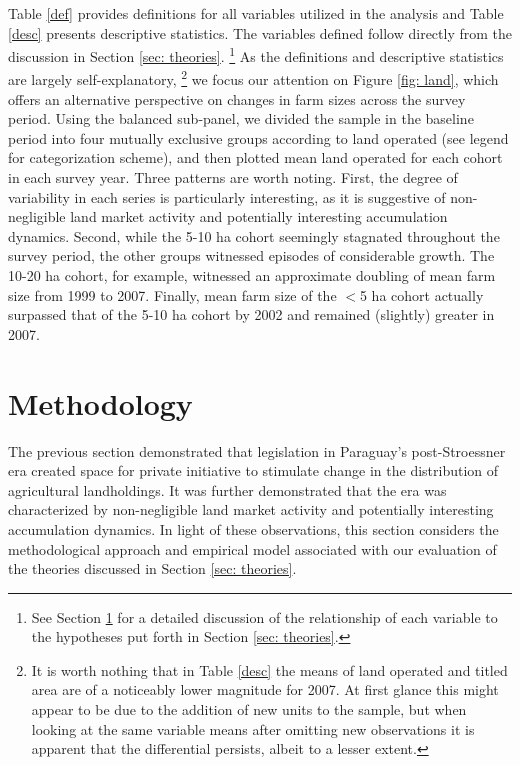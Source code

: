 \documentclass[english]{article}
\begin{document}
Table \ref{def} provides definitions for all variables utilized in the analysis 
and Table \ref{desc} presents descriptive statistics. 
The variables defined follow directly from the discussion in Section 
\ref{sec: theories}.%
\footnote{See Section \ref{sec: methodology} for a detailed 
discussion of the relationship of each variable to the hypotheses
put forth in Section \ref{sec: theories}.}
As the definitions and descriptive statistics are largely self-explanatory,%
\footnote{It is worth nothing that in Table \ref{desc} the means of land 
operated and titled area are of a noticeably lower magnitude for 2007. 
At first glance this might appear to be due to the addition of new units to the 
sample, but when looking at the same variable means after omitting new 
observations it is apparent that the differential persists, albeit to a lesser 
extent.}
we focus our attention on Figure \ref{fig: land}, which offers an alternative 
perspective on changes in farm sizes across the survey period.
Using the balanced sub-panel, we divided the sample in the baseline period 
into four mutually exclusive groups according to land operated (see legend for 
categorization scheme), and then plotted mean land operated for each cohort 
in each survey year.
Three patterns are worth noting.
First, the degree of variability in each series is particularly interesting, as it is 
suggestive of non-negligible land market activity and potentially interesting
accumulation dynamics.
Second, while the 5-10 ha cohort seemingly stagnated throughout the 
survey period, the other groups witnessed episodes of considerable growth.
The 10-20 ha cohort, for example, witnessed an approximate doubling of 
mean farm size from 1999 to 2007.
Finally, mean farm size of the $<$5 ha cohort actually surpassed that of the 
5-10 ha cohort by 2002 and remained (slightly) greater in 2007.


\section{Methodology}
\label{sec: methodology}

The previous section demonstrated that legislation in Paraguay's 
post-Stroessner era created space for private initiative to stimulate change in 
the distribution of agricultural landholdings.
It was further demonstrated that the era was characterized by non-negligible 
land market activity and potentially interesting accumulation dynamics.
In light of these observations, this section considers the methodological 
approach and empirical model associated with our evaluation of the 
theories discussed in Section \ref{sec: theories}.
\end{document}
